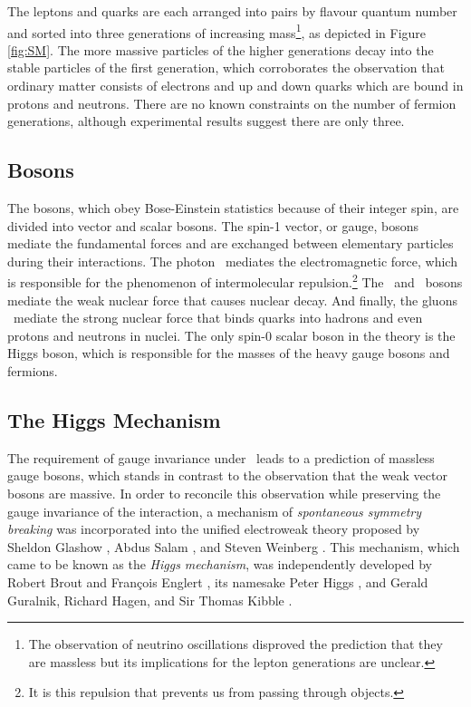 The leptons and quarks are each arranged into pairs by flavour quantum number and sorted into three generations of increasing mass\footnote{The observation of neutrino oscillations disproved the prediction that they are massless but its implications for the lepton generations are unclear.}, as depicted in Figure \ref{fig:SM}. The more massive particles of the higher generations decay into the stable particles of the first generation, which corroborates the observation that ordinary matter consists of electrons and up and down quarks which are bound in protons and neutrons. There are no known constraints on the number of fermion generations, although experimental results suggest there are only three.

\subsection{Bosons}

The bosons, which obey Bose-Einstein statistics because of their integer spin, are divided into vector and scalar bosons. The spin-1 vector, or gauge, bosons mediate the fundamental forces and are exchanged between elementary particles during their interactions. The photon \bosg\ mediates the electromagnetic force, which is responsible for the phenomenon of intermolecular repulsion.\footnote{It is this repulsion that prevents us from passing through objects.} The \bosW\ and \bosZ\ bosons mediate the weak nuclear force that causes nuclear decay. And finally, the gluons \bosgln\ mediate the strong nuclear force that binds quarks into hadrons and even protons and neutrons in nuclei. The only spin-0 scalar boson in the theory is the Higgs boson, which is responsible for the masses of the heavy gauge bosons and fermions.

\subsection{The Higgs Mechanism}

The requirement of gauge invariance under \symWEAK\ leads to a prediction of massless gauge bosons, which stands in contrast to the observation that the weak vector bosons are massive. In order to reconcile this observation while preserving the gauge invariance of the interaction, a mechanism of \textit{spontaneous symmetry breaking} was incorporated into the unified electroweak theory proposed by Sheldon Glashow \cite{EWKGLASHOW}, Abdus Salam \cite{EWKSALAM}, and Steven Weinberg \cite{EWKWEINBERG}. This mechanism, which came to be known as the \textit{Higgs mechanism}, was independently developed by Robert Brout and Fran\c{c}ois Englert \cite{HIGGSBE}, its namesake Peter Higgs \cite{HIGGSH}, and Gerald Guralnik, Richard Hagen, and Sir Thomas Kibble \cite{HIGGSGHK}.



